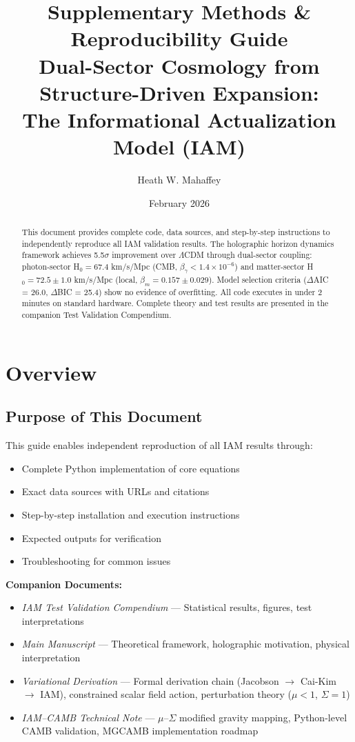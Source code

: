 \documentclass[11pt]{article}
\title{\textbf{Supplementary Methods \& Reproducibility Guide} \\ 
\large Dual-Sector Cosmology from Structure-Driven Expansion: \\
The Informational Actualization Model (IAM)}
\author{Heath W. Mahaffey}
\date{February 2026}
\begin{document}
\maketitle

\begin{abstract}
This document provides complete code, data sources, and step-by-step instructions to independently reproduce all IAM validation results. The holographic horizon dynamics framework achieves 5.5$\sigma$ improvement over $\Lambda$CDM through dual-sector coupling: photon-sector H$_0 = 67.4$ km/s/Mpc (CMB, $\beta_\gamma < 1.4 \times 10^{-6}$) and matter-sector H$_0 = 72.5 \pm 1.0$ km/s/Mpc (local, $\beta_m = 0.157 \pm 0.029$). Model selection criteria ($\Delta$AIC = 26.0, $\Delta$BIC = 25.4) show no evidence of overfitting. All code executes in under 2 minutes on standard hardware. Complete theory and test results are presented in the companion Test Validation Compendium.
\end{abstract}

\tableofcontents
\newpage

\section{Overview}

\subsection{Purpose of This Document}

This guide enables independent reproduction of all IAM results through:
\begin{itemize}
    \item Complete Python implementation of core equations
    \item Exact data sources with URLs and citations
    \item Step-by-step installation and execution instructions
    \item Expected outputs for verification
    \item Troubleshooting for common issues
\end{itemize}

\noindent\textbf{Companion Documents:}
\begin{itemize}
    \item \textit{IAM Test Validation Compendium} --- Statistical results, figures, test interpretations
    \item \textit{Main Manuscript} --- Theoretical framework, holographic motivation, physical interpretation
    \item \textit{Variational Derivation} --- Formal derivation chain (Jacobson $\to$ Cai-Kim $\to$ IAM), constrained scalar field action, perturbation theory ($\mu < 1$, $\Sigma = 1$)
    \item \textit{IAM--CAMB Technical Note} --- $\mu$--$\Sigma$ modified gravity mapping, Python-level CAMB validation, MGCAMB implementation roadmap
\end{itemize}
\end{document}

